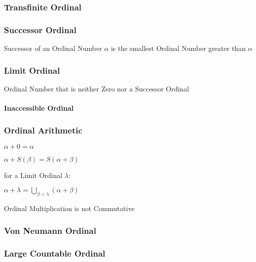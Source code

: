 \subsubsection{Transfinite Ordinal}\label{sec:transfinite_ordinal}

\subsubsection{Successor Ordinal}\label{sec:successor_ordinal}

Successor of an Ordinal Number $\alpha$ is the smallest Ordinal Number
greater than $\alpha$



\subsubsection{Limit Ordinal}\label{sec:limit_ordinal}

Ordinal Number that is neither Zero nor a Successor Ordinal



\paragraph{Inaccessible Ordinal}\label{sec:inaccessible_ordinal}\hfill



\subsubsection{Ordinal Arithmetic}\label{sec:ordinal_arithmetic}

$\alpha + 0 = \alpha$

$\alpha + S(\beta) = S(\alpha + \beta)$

for a Limit Ordinal $\lambda$:

$\alpha + \lambda = \bigcup_{\beta < \lambda} (\alpha + \beta)$

Ordinal Multiplication is not Commutative



\subsubsection{Von Neumann Ordinal}\label{sec:vonneumann_ordinal}

\subsubsection{Large Countable Ordinal}\label{sec:large_countable}

